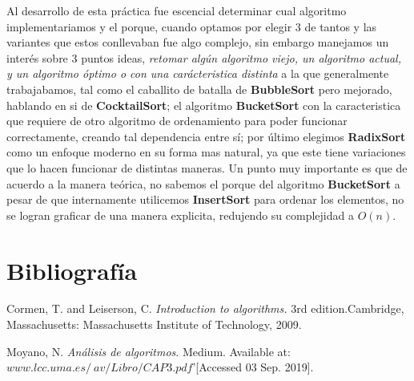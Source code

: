 \documentclass[12pt,twoside]{article}
\begin{document}
Al desarrollo de esta práctica fue escencial determinar cual algoritmo implementariamos y el porque, cuando optamos por elegir 3 de tantos y las variantes que
estos conllevaban fue algo complejo, sin embargo manejamos un interés sobre 3 puntos ideas, \textit{retomar algún algoritmo viejo, un algoritmo actual, y un 
algoritmo óptimo o con una carácteristica distinta} a la que generalmente trabajabamos, tal como el caballito de batalla de \textbf{BubbleSort} pero mejorado,
hablando en si de \textbf{CocktailSort}; el algoritmo \textbf{BucketSort} con la caracteristica que requiere de otro algoritmo de ordenamiento para poder funcionar
correctamente, creando tal dependencia entre sí; por último elegimos \textbf{RadixSort} como  un enfoque moderno en su forma mas natural, ya que este tiene variaciones
que lo hacen funcionar de distintas maneras. Un punto muy importante es que de acuerdo a la manera teórica, no sabemos el porque del algoritmo \textbf{BucketSort}
a pesar de que internamente utilicemos \textbf{InsertSort} para ordenar los elementos, no se logran graficar de una manera explicita, redujendo su complejidad a $O(n)$.


\section{Bibliograf\'ia}

\begin{thebibliography}{9}
  Cormen, T. and Leiserson, C.
  \textit{Introduction to algorithms.} 
  3rd edition.Cambridge, Massachusetts: Massachusetts Institute of Technology, 2009.

  Moyano, N.
  \textit{Análisis de algoritmos}.
  Medium. Available at: $www.lcc.uma.es/~av/Libro/CAP3.pdf$'[Accessed 03 Sep. 2019].
\end{thebibliography}
\end{document}
